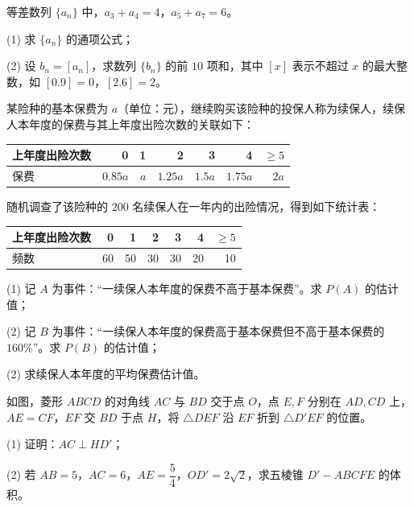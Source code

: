 \begin{question}
等差数列 $\{a_n\}$ 中，$a_3+a_4=4$，$a_5+a_7=6$。

   (1) 求 $\{a_n\}$ 的通项公式；

   (2) 设 $b_n=[a_n]$，求数列 $\{b_n\}$ 的前 $10$ 项和，其中 $[x]$ 表示不超过 $x$ 的最大整数，如 $[0.9]=0$，$[2.6]=2$。

\end{question}
\begin{question}
某险种的基本保费为 $a$（单位：元），继续购买该险种的投保人称为续保人，续保人本年度的保费与其上年度出险次数的关联如下：

\begin{center}
\begin{tabular}{lrrrrrr}
\toprule
上年度出险次数 & 0 & 1 & 2 & 3 & 4 & $\geqslant5$ \\
\midrule
保费 & $0.85a$ & $a$ & $1.25a$ & $1.5a$ & $1.75a$ & $2a$ \\
\bottomrule
\end{tabular}
\end{center}

随机调查了该险种的 $200$ 名续保人在一年内的出险情况，得到如下统计表：

\begin{center}
\begin{tabular}{lrrrrrr}
\toprule
上年度出险次数 & 0 & 1 & 2 & 3 & 4 & $\geqslant5$ \\
\midrule
频数 & 60 & 50 & 30 & 30 & 20 & 10 \\
\bottomrule
\end{tabular}
\end{center}

(1) 记 $A$ 为事件：“一续保人本年度的保费不高于基本保费”。求 $P(A)$ 的估计值；

(2) 记 $B$ 为事件：“一续保人本年度的保费高于基本保费但不高于基本保费的 $160\%$”。求 $P(B)$ 的估计值；

(2) 求续保人本年度的平均保费估计值。

\Needspace{0.4\textheight}
\end{question}
\begin{question}
如图，菱形 $ABCD$ 的对角线 $AC$ 与 $BD$ 交于点 $O$，点 $E,F$ 分别在 $AD,CD$ 上，$AE=CF$，$EF$ 交 $BD$ 于点 $H$，将 $\triangle DEF$ 沿 $EF$ 折到 $\triangle D'EF$ 的位置。
\nopagebreak[4]
\begin{center}\end{center}
\nopagebreak[4]
   (1) 证明：$AC\perp HD'$；

   (2) 若 $AB=5$，$AC=6$，$AE=\dfrac54$，$OD'=2\sqrt2$，求五棱锥 $D'-ABCFE$ 的体积。

\end{question}
